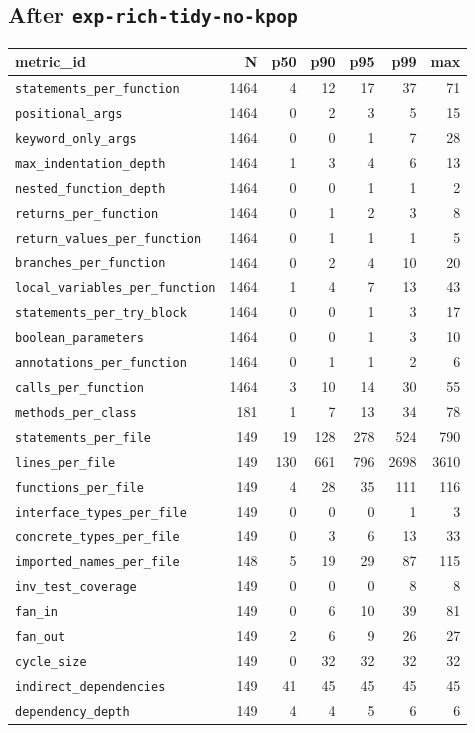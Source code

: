 \documentclass[11pt]{article}
\begin{document}
\subsection{After \texttt{exp-rich-tidy-no-kpop}}
\label{app:kiss-no-kpop}

{\scriptsize
\begin{longtable}{@{}lrrrrrr@{}}
  \toprule
  metric\_id & N & p50 & p90 & p95 & p99 & max \\
  \midrule
  \endhead
  \texttt{statements\_per\_function} & 1464 & 4 & 12 & 17 & 37 & 71 \\
  \texttt{positional\_args} & 1464 & 0 & 2 & 3 & 5 & 15 \\
  \texttt{keyword\_only\_args} & 1464 & 0 & 0 & 1 & 7 & 28 \\
  \texttt{max\_indentation\_depth} & 1464 & 1 & 3 & 4 & 6 & 13 \\
  \texttt{nested\_function\_depth} & 1464 & 0 & 0 & 1 & 1 & 2 \\
  \texttt{returns\_per\_function} & 1464 & 0 & 1 & 2 & 3 & 8 \\
  \texttt{return\_values\_per\_function} & 1464 & 0 & 1 & 1 & 1 & 5 \\
  \texttt{branches\_per\_function} & 1464 & 0 & 2 & 4 & 10 & 20 \\
  \texttt{local\_variables\_per\_function} & 1464 & 1 & 4 & 7 & 13 & 43 \\
  \texttt{statements\_per\_try\_block} & 1464 & 0 & 0 & 1 & 3 & 17 \\
  \texttt{boolean\_parameters} & 1464 & 0 & 0 & 1 & 3 & 10 \\
  \texttt{annotations\_per\_function} & 1464 & 0 & 1 & 1 & 2 & 6 \\
  \texttt{calls\_per\_function} & 1464 & 3 & 10 & 14 & 30 & 55 \\
  \texttt{methods\_per\_class} & 181 & 1 & 7 & 13 & 34 & 78 \\
  \texttt{statements\_per\_file} & 149 & 19 & 128 & 278 & 524 & 790 \\
  \texttt{lines\_per\_file} & 149 & 130 & 661 & 796 & 2698 & 3610 \\
  \texttt{functions\_per\_file} & 149 & 4 & 28 & 35 & 111 & 116 \\
  \texttt{interface\_types\_per\_file} & 149 & 0 & 0 & 0 & 1 & 3 \\
  \texttt{concrete\_types\_per\_file} & 149 & 0 & 3 & 6 & 13 & 33 \\
  \texttt{imported\_names\_per\_file} & 148 & 5 & 19 & 29 & 87 & 115 \\
  \texttt{inv\_test\_coverage} & 149 & 0 & 0 & 0 & 8 & 8 \\
  \texttt{fan\_in} & 149 & 0 & 6 & 10 & 39 & 81 \\
  \texttt{fan\_out} & 149 & 2 & 6 & 9 & 26 & 27 \\
  \texttt{cycle\_size} & 149 & 0 & 32 & 32 & 32 & 32 \\
  \texttt{indirect\_dependencies} & 149 & 41 & 45 & 45 & 45 & 45 \\
  \texttt{dependency\_depth} & 149 & 4 & 4 & 5 & 6 & 6 \\
  \bottomrule
\end{longtable}
}
\end{document}
